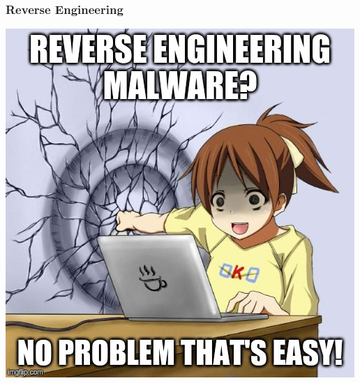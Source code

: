 \documentclass[aspectratio=169]{beamer}
\begin{document}
\begin{frame}
  \frametitle{Reverse Engineering}
  \begin{center}
    \includegraphics[scale=0.4]{reverse-engineering}
  \end{center}
\end{frame}
\end{document}
